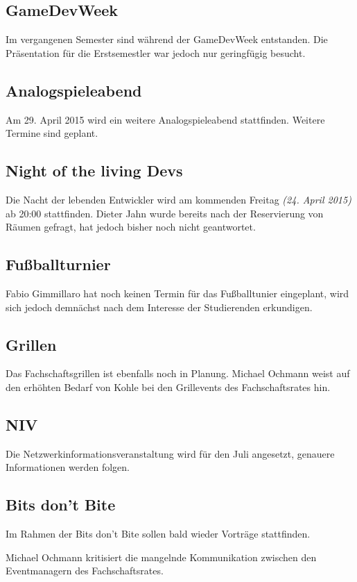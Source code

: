 \documentclass[a4paper, 11pt]{article} %
\begin{document}
\subsection{GameDevWeek}
Im vergangenen Semester sind während der GameDevWeek entstanden. Die Präsentation für die Erstsemestler war jedoch nur geringfügig besucht.

\subsection{Analogspieleabend}
Am 29. April 2015 wird ein weitere Analogspieleabend stattfinden. Weitere Termine sind geplant.

\subsection{Night of the living Devs}
Die Nacht der lebenden Entwickler wird am kommenden Freitag \textit{(24. April 2015)} ab 20:00 stattfinden. Dieter Jahn wurde bereits nach der Reservierung von Räumen gefragt, hat jedoch bisher noch nicht geantwortet.

\subsection{Fußballturnier}
Fabio Gimmillaro hat noch keinen Termin für das Fußballtunier eingeplant, wird sich jedoch demnächst nach dem Interesse der Studierenden erkundigen.

\subsection{Grillen}
Das Fachschaftsgrillen ist ebenfalls noch in Planung. Michael Ochmann weist auf den erhöhten Bedarf von Kohle bei den Grillevents des Fachschaftsrates hin.

\subsection{NIV}
Die Netzwerkinformationsveranstaltung wird für den Juli angesetzt, genauere Informationen werden folgen.

\subsection{Bits don't Bite}
Im Rahmen der Bits don't Bite sollen bald wieder Vorträge stattfinden.\\
\begin{flushleft}
	Michael Ochmann kritisiert die mangelnde Kommunikation zwischen den Eventmanagern des Fachschaftsrates.
\end{flushleft}
\end{document}
